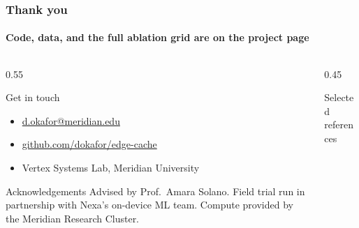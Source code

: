 \begin{frame}
  \frametitle{Thank you}
  \framesubtitle{Code, data, and the full ablation grid are on the project page}
  \begin{columns}[T]
    \begin{column}{0.55\textwidth}
      \begin{block}{Get in touch}
        \begin{itemize}
          \item[\faEnvelope] \href{mailto:d.okafor@meridian.edu}{d.okafor@meridian.edu}
          \item[\faGithub] \href{https://github.com/dokafor/edge-cache}{github.com/dokafor/edge-cache}
          \item[\faUsers] Vertex Systems Lab, Meridian University
        \end{itemize}
      \end{block}
      \vspace{2mm}
      \begin{block}{Acknowledgements}
        \small Advised by Prof.\ Amara Solano. Field trial run in partnership with Nexa's on-device ML team. Compute provided by the Meridian Research Cluster.
      \end{block}
    \end{column}
    \begin{column}{0.45\textwidth}
      \begin{block}{Selected references}
        \nocite{*}
        \tiny
        
        
      \end{block}
    \end{column}
  \end{columns}
\end{frame}
